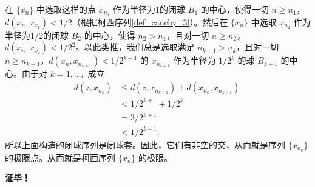 在 $\{x_n\}$ 中选取这样的点 $x_{n_1}$ 作为半径为1的闭球 $B_1$ 的中心，使得一切 $n\geq n_1$，$d(x_n,x_{x_1})<1/2$（根据柯西序列\autoref{def_cauchy_3}）。然后在 $\{x_n\}$ 中选取 $x_{n_2}$ 作为半径为1/2的闭球 $B_2$ 的中心，使得 $n_2>n_1$，且对一切 $n\geq n_2$，$d(x_n,x_{x_2})<1/2^2$。以此类推，我们总是选取满足 $n_{k+1}>n_k$，且对一切 $n\geq n_{k+1}$，$d(x_n,x_{n_{k+1}})<1/2^{k+1}$ 的 $x_{n_{k+1}}$ 作为半径为 $1/2^k$ 的球 $B_{k+1}$ 的中心。由于对 $k=1,\ldots,$ 成立
\begin{equation}
\begin{aligned}
d(z,x_{n_k})&\leq d(z,x_{n_{k+1}})+d(x_{n_k},x_{n_{k+1}})\\
&<1/2^{k+1}+1/2^k\\
&=3/2^{k+1}\\
&<1/2^{k-1}.
\end{aligned}~
\end{equation}
所以上面构造的闭球序列是闭球套。因此，它们有非空的交，从而就是序列 $\{x_{n_k}\}$ 的极限点。从而就是柯西序列 $\{x_n\}$ 的极限。

\textbf{证毕！}









